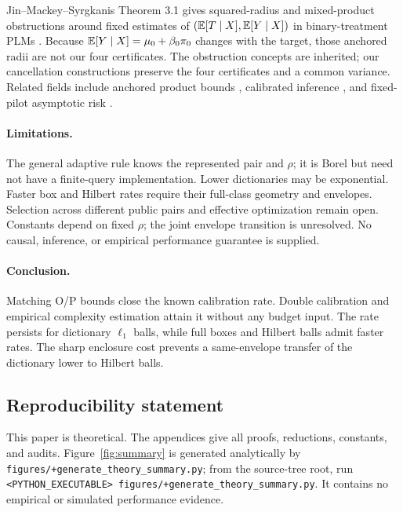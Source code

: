 \documentclass{article}
\theoremstyle{definition}
\theoremstyle{remark}
\begin{document}
Jin--Mackey--Syrgkanis Theorem 3.1 gives squared-radius and mixed-product obstructions around fixed estimates of \((\mathbb E[T\mid X],\mathbb E[Y\mid X])\) in binary-treatment PLMs \citep{jin2025hardnormal}. Because \(\mathbb E[Y\mid X]=\mu_0+\beta_0\pi_0\) changes with the target, those anchored radii are not our four certificates. The obstruction concepts are inherited; our cancellation constructions preserve the four certificates and a common variance. Related fields include anchored product bounds \citep{jin2026sharpstructureagnostic}, calibrated inference \citep{vanderlaan2025calibrateddml}, and fixed-pilot asymptotic risk \citep{liu2026dmlinadmissibility}.

\paragraph{Limitations.}
The general adaptive rule knows the represented pair and \(\rho\); it is Borel but need not have a finite-query implementation. Lower dictionaries may be exponential. Faster box and Hilbert rates require their full-class geometry and envelopes. Selection across different public pairs and effective optimization remain open. Constants depend on fixed \(\rho\); the joint envelope transition is unresolved. No causal, inference, or empirical performance guarantee is supplied.

\paragraph{Conclusion.}
Matching O/P bounds close the known calibration rate. Double calibration and empirical complexity estimation attain it without any budget input. The rate persists for dictionary \(\ell_1\) balls, while full boxes and Hilbert balls admit faster rates. The sharp enclosure cost prevents a same-envelope transfer of the dictionary lower to Hilbert balls.

\clearpage
\subsection*{Reproducibility statement}
This paper is theoretical.  The appendices give all proofs, reductions,
constants, and audits.  Figure~\ref{fig:summary} is generated analytically by
\nolinkurl{figures/+generate_theory_summary.py}; from the source-tree root, run
\texttt{<PYTHON\_EXECUTABLE>}\ \texttt{figures/+generate\_theory\_summary.py}.
It contains no empirical or simulated performance evidence.
\end{document}
